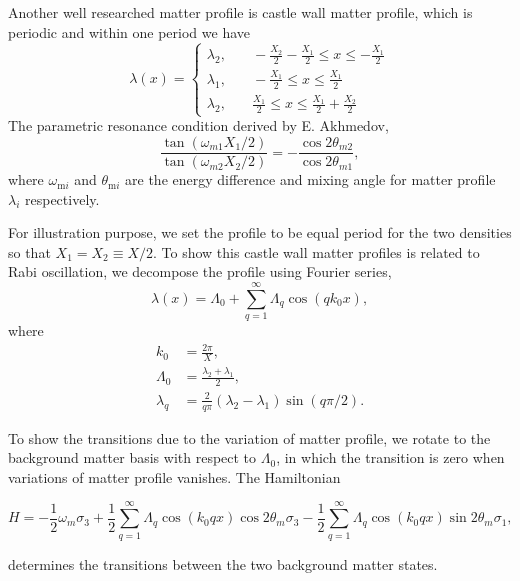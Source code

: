 \documentclass[%
reprint,
 amsmath,amssymb,
 aps,
]{revtex4-1}
\begin{document}

Another well researched matter profile is castle wall matter profile, which is periodic and within one period we have
\begin{equation}
    \lambda(x) = \begin{cases} \lambda_2 , &\quad -\frac{X_2}{2}-\frac{X_1}{2}\le x \le -\frac{X_1}{2} \\
\lambda_1, &\quad -\frac{X_1}{2}\le x\le \frac{X_1}{2} \\
\lambda_2, &\quad \frac{X_1}{2}\le x\le \frac{X_1}{2}+\frac{X_2}{2}
\end{cases}
\end{equation}
The parametric resonance condition derived by E. Akhmedov\cite{Akhmedov2000},
\begin{equation}
    \frac{\tan (\omega_{m1}X_1/2)}{\tan (\omega_{m2}X_2/2)} = - \frac{\cos 2\theta_{m2}}{\cos 2\theta_{m1}},
\end{equation}
where $\omega_{\mathrm{m}i}$ and $\theta_{\mathrm{m}i}$ are the energy difference and mixing angle for matter profile $\lambda_i$ respectively. 

For illustration purpose, we set the profile to be equal period for the two densities so that $X_1=X_2\equiv X/2$. To show this castle wall matter profiles is related to Rabi oscillation, we decompose the profile using Fourier series,
\begin{equation}
\lambda(x) = \Lambda_0 + \sum_{q=1}^{\infty} \Lambda_q \cos\left( q k_0  x \right),
\end{equation}
where 
\begin{align*}
k_0 &= \frac{2\pi}{X}, \\
\Lambda_0 &= \frac{\lambda_2 + \lambda_1 }{2}, \\
\lambda_q & = \frac{2}{q\pi}  \left( \lambda_2 -  \lambda_1 \right) \sin(q \pi /2) .
\end{align*}

To show the transitions due to the variation of matter profile, we rotate to the background matter basis with respect to $\Lambda_0$, in which the transition is zero when variations of matter profile vanishes. The Hamiltonian
\begin{widetext}
\begin{equation}
H = - \frac{1}{2}\omega_m \sigma_3  + \frac{1}{2} \sum_{q=1}^{\infty} \Lambda_q \cos\left( k_0 q x \right) \cos 2\theta_m \sigma_3 - \frac{1}{2} \sum_{q=1}^{\infty} \Lambda_q \cos\left( k_0 q x \right) \sin 2\theta_m \sigma_1,
\end{equation}
\end{widetext}
determines the transitions between the two background matter states.
\end{document}
